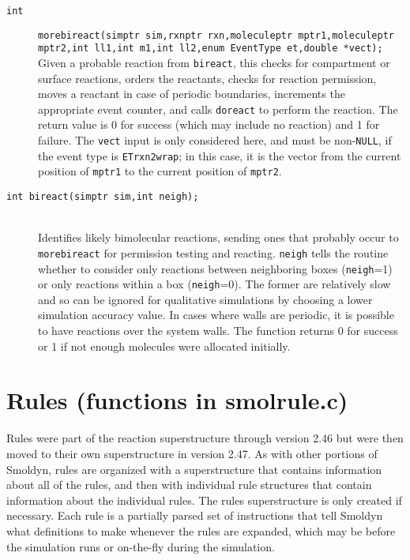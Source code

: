 \documentclass {book}
\begin{document}
\begin{description}
\item[\texttt{int}]
\texttt{morebireact(simptr sim,rxnptr rxn,moleculeptr mptr1,moleculeptr mptr2,int ll1,int m1,int ll2,enum EventType et,double *vect);} \\
Given a probable reaction from \texttt{bireact}, this checks for compartment or surface reactions, orders the reactants, checks for reaction permission, moves a reactant in case of periodic boundaries, increments the appropriate event counter, and calls \texttt{doreact} to perform the reaction.  The return value is 0 for success (which may include no reaction) and 1 for failure.  The \texttt{vect} input is only considered here, and must be non-\texttt{NULL}, if the event type is \texttt{ETrxn2wrap}; in this case, it is the vector from the current position of \texttt{mptr1} to the current position of \texttt{mptr2}.

\item[\texttt{int bireact(simptr sim,int neigh);}]
\hfill \\
Identifies likely bimolecular reactions, sending ones that probably occur to \texttt{morebireact} for permission testing and reacting.  \texttt{neigh} tells the routine whether to consider only reactions between neighboring boxes (\texttt{neigh}=1) or only reactions within a box (\texttt{neigh}=0).  The former are relatively slow and so can be ignored for qualitative simulations by choosing a lower simulation accuracy value.  In cases where walls are periodic, it is possible to have reactions over the system walls.  The function returns 0 for success or 1 if not enough molecules were allocated initially.

\end{description}

\section{Rules (functions in smolrule.c)}

Rules were part of the reaction superstructure through version 2.46 but were then moved to their own superstructure in version 2.47.  As with other portions of Smoldyn, rules are organized with a superstructure that contains information about all of the rules, and then with individual rule structures that contain information about the individual rules.  The rules superstructure is only created if necessary.  Each rule is a partially parsed set of instructions that tell Smoldyn what definitions to make whenever the rules are expanded, which may be before the simulation runs or on-the-fly during the simulation.
\end{document}
